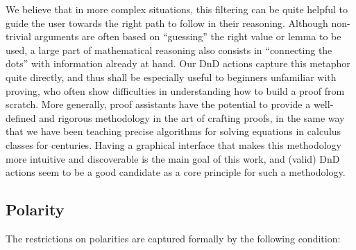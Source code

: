 We believe that in more complex situations, this filtering can be quite helpful
to guide the user towards the right path to follow in their reasoning. Although
non-trivial arguments are often based on ``guessing'' the right value or lemma
to be used, a large part of mathematical reasoning also consists in ``connecting
the dots'' with information already at hand. Our DnD actions capture this
metaphor quite directly, and thus shall be especially useful to beginners
unfamiliar with proving, who often show difficulties in understanding how to
build a proof from scratch. More generally, proof assistants have the potential
to provide a well-defined and rigorous methodology in the art of crafting
proofs, in the same way that we have been teaching precise algorithms for
solving equations in calculus classes for centuries. Having a graphical
interface that makes this methodology more intuitive and discoverable is the
main goal of this work, and (valid) DnD actions seem to be a good candidate as a
core principle for such a methodology.

\subsection{Polarity}

The restrictions on polarities are captured formally by the following condition:

  

